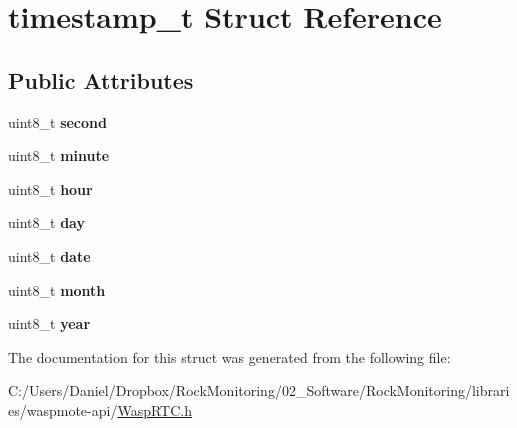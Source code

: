 \hypertarget{structtimestamp__t}{}\section{timestamp\+\_\+t Struct Reference}
\label{structtimestamp__t}
\subsection*{Public Attributes}
\begin{DoxyCompactItemize}
\item 
uint8\+\_\+t {\bfseries second}\hypertarget{structtimestamp__t_a59b9c870a427b56ebf68f9f7a90331c2}{}\label{structtimestamp__t_a59b9c870a427b56ebf68f9f7a90331c2}

\item 
uint8\+\_\+t {\bfseries minute}\hypertarget{structtimestamp__t_a7d00afc68582d1585cfea58b334f1a05}{}\label{structtimestamp__t_a7d00afc68582d1585cfea58b334f1a05}

\item 
uint8\+\_\+t {\bfseries hour}\hypertarget{structtimestamp__t_af8a83bb86e1e3c69de81da1b23102bfb}{}\label{structtimestamp__t_af8a83bb86e1e3c69de81da1b23102bfb}

\item 
uint8\+\_\+t {\bfseries day}\hypertarget{structtimestamp__t_ad25f2269fecf2afbe3f0a77741a727f8}{}\label{structtimestamp__t_ad25f2269fecf2afbe3f0a77741a727f8}

\item 
uint8\+\_\+t {\bfseries date}\hypertarget{structtimestamp__t_ad09a8911e1e331ae44c7fb7d4bf8547d}{}\label{structtimestamp__t_ad09a8911e1e331ae44c7fb7d4bf8547d}

\item 
uint8\+\_\+t {\bfseries month}\hypertarget{structtimestamp__t_aa60f18c9570931b2df258c39663730c9}{}\label{structtimestamp__t_aa60f18c9570931b2df258c39663730c9}

\item 
uint8\+\_\+t {\bfseries year}\hypertarget{structtimestamp__t_a711a631e04eae4cdcc995d4b32d435ef}{}\label{structtimestamp__t_a711a631e04eae4cdcc995d4b32d435ef}

\end{DoxyCompactItemize}


The documentation for this struct was generated from the following file\+:\begin{DoxyCompactItemize}
\item 
C\+:/\+Users/\+Daniel/\+Dropbox/\+Rock\+Monitoring/02\+\_\+\+Software/\+Rock\+Monitoring/libraries/waspmote-\/api/\hyperlink{_wasp_r_t_c_8h}{Wasp\+R\+T\+C.\+h}\end{DoxyCompactItemize}
